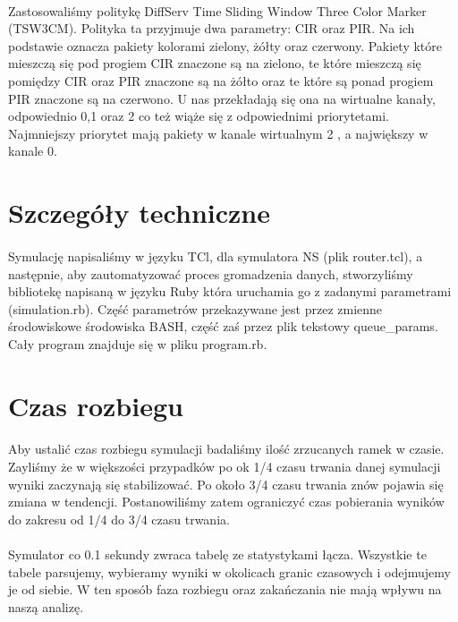 \documentclass[a4paper]{article}
\begin{document}
\paragraph{}
Zastosowaliśmy politykę DiffServ Time Sliding Window Three Color Marker (TSW3CM).
Polityka ta przyjmuje dwa parametry: CIR oraz PIR. Na ich podstawie oznacza pakiety kolorami zielony, żółty oraz czerwony. Pakiety które mieszczą się pod progiem CIR znaczone są na zielono, te które mieszczą się pomiędzy CIR oraz PIR znaczone są na żółto oraz te które są ponad progiem PIR znaczone są na czerwono. U nas przekładają się ona na wirtualne kanały, odpowiednio 0,1 oraz 2 co też wiąże się z odpowiednimi priorytetami. Najmniejszy priorytet mają pakiety w kanale wirtualnym 2 , a największy w kanale 0.


\section{Szczegóły techniczne}


\paragraph{}
Symulację napisaliśmy w języku TCl, dla symulatora NS (plik router.tcl), a następnie, aby zautomatyzować proces gromadzenia danych, stworzyliśmy bibliotekę napisaną w języku Ruby która uruchamia go z zadanymi parametrami (simulation.rb). Część parametrów przekazywane jest przez zmienne środowiskowe środowiska BASH, część zaś przez plik tekstowy queue\_params. Cały program znajduje się w pliku program.rb.


\section{Czas rozbiegu}

\paragraph{}
Aby ustalić czas rozbiegu symulacji badaliśmy ilość zrzucanych ramek w czasie. Zayliśmy że w większości przypadków po ok 1/4 czasu trwania danej symulacji wyniki zaczynają się stabilizować. Po około 3/4 czasu trwania znów pojawia się zmiana w tendencji. Postanowiliśmy zatem ograniczyć czas pobierania wyników do zakresu od 1/4 do 3/4 czasu trwania.

\paragraph{}
Symulator co 0.1 sekundy zwraca tabelę ze statystykami łącza. Wszystkie te tabele parsujemy, wybieramy wyniki w okolicach granic czasowych i odejmujemy je od siebie. W ten sposób faza rozbiegu oraz zakańczania nie mają wpływu na naszą analizę.
\end{document}
